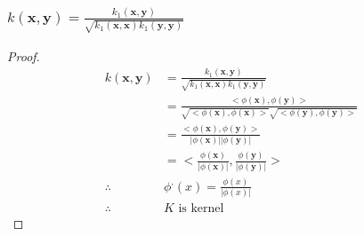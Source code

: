 \documentclass[a4paper]{article}
\begin{document}
\subsubsection{$k(\mathbf{x},\mathbf{y})=\frac{k_1(\mathbf{x},\mathbf{y})}{\sqrt{k_1(\mathbf{x},\mathbf{x})k_1(\mathbf{y},\mathbf{y})}}$}

\begin{proof}
    \begin{align*}
        k(\mathbf{x},\mathbf{y})&=\frac{k_1(\mathbf{x},\mathbf{y})}{\sqrt{k_1(\mathbf{x},\mathbf{x})k_1(\mathbf{y},\mathbf{y})}}\\
        &=\frac{<\phi(\mathbf{x}),\phi(\mathbf{y})>}{\sqrt{<\phi(\mathbf{x}),\phi(\mathbf{x})>}\sqrt{<\phi(\mathbf{y}),\phi(\mathbf{y})>}}\\
        &=\frac{<\phi(\mathbf{x}),\phi(\mathbf{y})>}{|\phi(\mathbf{x})||\phi(\mathbf{y})|}\\
        &=<\frac{\phi(\mathbf{x})}{|\phi(\mathbf{x})|},\frac{\phi(\mathbf{y})}{|\phi(\mathbf{y})|}>\\
        \therefore&\phi^,(x)=\frac{\phi(x)}{|\phi(x)|}\\
        \therefore&K\text{ is kernel}
    \end{align*}
\end{proof}



\end{document}
